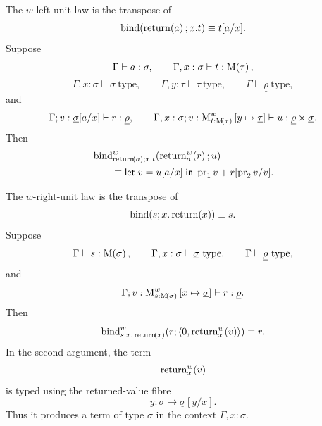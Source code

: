 \documentclass[11pt,a4paper]{article}
\theoremstyle{definition}
\theoremstyle{remark}
\providecommand{\casubst}[3]{#1[#3/#2]}
\providecommand{\letst}[3]{\mathsf{let}\;#1=#2\;\mathsf{in}\;#3}
\providecommand{\lintype}[1]{\underline{#1}}
\begin{document}
The \(w\)-left-unit law is the transpose of
\[
  \fn[n]{\opn[b]{bind}}{
    \fn[n]{\opn[b]{return}}{a};
    x.t
  }
  \equiv
  \casubst{t}{x}{a}.
\]
Suppose
\[
  \Gamma\vdash a:\sigma,
  \qquad
  \Gamma,x:\sigma\vdash t:\Fun[nn]{\opn[b]{M}}{\tau},
\]
\[
  \Gamma,x:\sigma\vdash \lintype{\sigma}\ \mathrm{type},
  \qquad
  \Gamma,y:\tau\vdash \lintype{\tau}\ \mathrm{type},
  \qquad
  \Gamma\vdash \lintype{\rho}\ \mathrm{type},
\]
and
\[
  \Gamma;
  v:\casubst{\lintype{\sigma}}{x}{a}
  \vdash r:\lintype{\rho},
  \qquad
  \Gamma,x:\sigma;
  v:\opn[b]{M}^{w}_{t:\Fun[nn]{\opn[b]{M}}{\tau}}
    \left[y\mapsto\lintype{\tau}\right]
  \vdash u:\lintype{\rho}\times\lintype{\sigma}.
\]
Then
\begin{equation}
  \label{eq:appendix-target-language-monad-w-left-unit}
  \begin{aligned}
    &
    \fn[n]{
      \opn[b]{bind}^{w}_{
        \fn[n]{\opn[b]{return}}{a};
        x.t
      }
    }{
      \fn[n]{\opn[b]{return}^{w}_{a}}{r};
      u
    }
    \\
    &\qquad\equiv
    \letst{v}{\casubst{u}{x}{a}}{
      \opn[b]{pr}_{1}v
      +
      \casubst{r}{v}{\opn[b]{pr}_{2}v}
    } .
  \end{aligned}
\end{equation}

The \(w\)-right-unit law is the transpose of
\[
  \fn[n]{\opn[b]{bind}}{
    s;
    x.\fn[n]{\opn[b]{return}}{x}
  }
  \equiv
  s.
\]
Suppose
\[
  \Gamma\vdash s:\Fun[nn]{\opn[b]{M}}{\sigma},
  \qquad
  \Gamma,x:\sigma\vdash \lintype{\sigma}\ \mathrm{type},
  \qquad
  \Gamma\vdash \lintype{\rho}\ \mathrm{type},
\]
and
\[
  \Gamma;
  v:\opn[b]{M}^{w}_{s:\Fun[nn]{\opn[b]{M}}{\sigma}}
    \left[x\mapsto\lintype{\sigma}\right]
  \vdash r:\lintype{\rho}.
\]
Then
\begin{equation}
  \label{eq:appendix-target-language-monad-w-right-unit}
  \fn[n]{
    \opn[b]{bind}^{w}_{
      s;
      x.\fn[n]{\opn[b]{return}}{x}
    }
  }{
    r;
    \tuple{
      \opn[b]{0},
      \fn[n]{\opn[b]{return}^{w}_{x}}{v}
    }
  }
  \equiv
  r .
\end{equation}
In the second argument, the term
\[
  \fn[n]{\opn[b]{return}^{w}_{x}}{v}
\]
is typed using the returned-value fibre
\[
  y:\sigma\mapsto \casubst{\lintype{\sigma}}{x}{y}.
\]
Thus it produces a term of type \(\lintype{\sigma}\) in the context
\(\Gamma,x:\sigma\).
\end{document}
